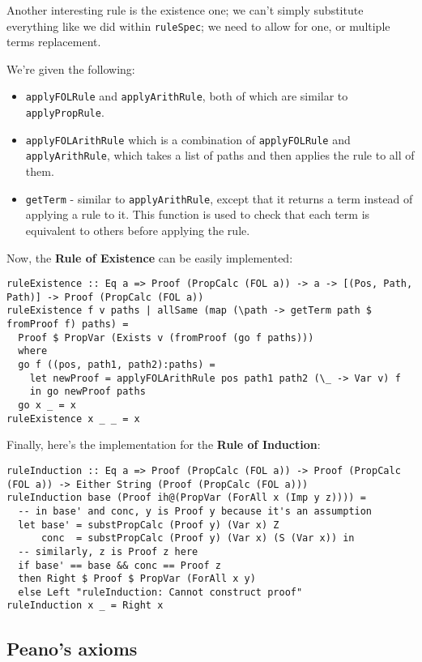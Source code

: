 \documentclass{article}
\begin{document}
Another interesting rule is the existence one; we can't simply substitute everything like we did within \texttt{ruleSpec}; we need to allow for one, or multiple terms replacement.

We're given the following:

\begin{itemize}
\item \texttt{applyFOLRule} and \texttt{applyArithRule}, both of which are similar to \texttt{applyPropRule}.
\item \texttt{applyFOLArithRule} which is a combination of \texttt{applyFOLRule} and \texttt{applyArithRule}, which takes a list of paths and then applies the rule to all of them.
\item \texttt{getTerm} - similar to \texttt{applyArithRule}, except that it returns a term instead of applying a rule to it. This function is used to check that each term is equivalent to others before applying the rule.
\end{itemize}

Now, the \textbf{Rule of Existence} can be easily implemented:

\begin{lstlisting}
ruleExistence :: Eq a => Proof (PropCalc (FOL a)) -> a -> [(Pos, Path, Path)] -> Proof (PropCalc (FOL a))
ruleExistence f v paths | allSame (map (\path -> getTerm path $ fromProof f) paths) =
  Proof $ PropVar (Exists v (fromProof (go f paths)))
  where
  go f ((pos, path1, path2):paths) =
    let newProof = applyFOLArithRule pos path1 path2 (\_ -> Var v) f
    in go newProof paths
  go x _ = x
ruleExistence x _ _ = x
\end{lstlisting}

Finally, here's the implementation for the \textbf{Rule of Induction}:

\begin{lstlisting}
ruleInduction :: Eq a => Proof (PropCalc (FOL a)) -> Proof (PropCalc (FOL a)) -> Either String (Proof (PropCalc (FOL a)))
ruleInduction base (Proof ih@(PropVar (ForAll x (Imp y z)))) =
  -- in base' and conc, y is Proof y because it's an assumption
  let base' = substPropCalc (Proof y) (Var x) Z
      conc  = substPropCalc (Proof y) (Var x) (S (Var x)) in
  -- similarly, z is Proof z here
  if base' == base && conc == Proof z
  then Right $ Proof $ PropVar (ForAll x y)
  else Left "ruleInduction: Cannot construct proof"
ruleInduction x _ = Right x
\end{lstlisting}

\subsection{Peano's axioms}
\end{document}
